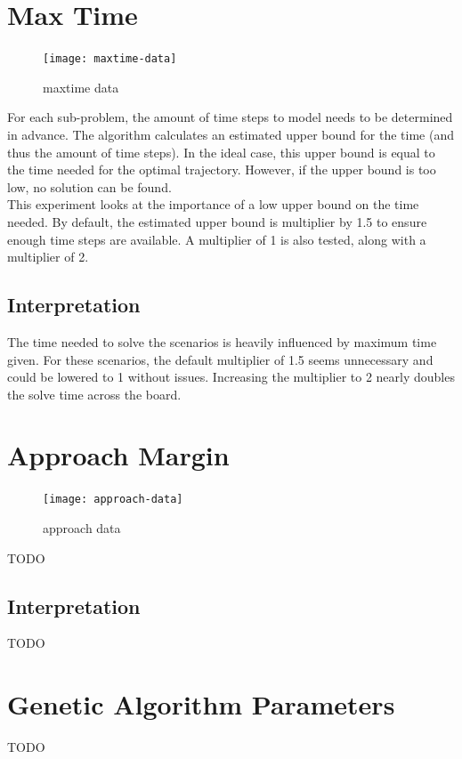 \clearpage
\section{Max Time}
\label{subsec:maxtime}
\begin{figure}[]
	\centering
	\texttt{[image: maxtime-data]}
	\caption{maxtime data}
	\label{fig:maxtime-data}
\end{figure}
For each sub-problem, the amount of time steps to model needs to be determined in advance. The algorithm calculates an estimated upper bound for the time (and thus the amount of time steps). In the ideal case, this upper bound is equal to the time needed for the optimal trajectory. However, if the upper bound is too low, no solution can be found.\\
This experiment looks at the importance of a low upper bound on the time needed. By default, the estimated upper bound is multiplier by 1.5 to ensure enough time steps are available. A multiplier of 1 is also tested, along with a multiplier of 2. 

\subsection{Interpretation}
The time needed to solve the scenarios is heavily influenced by maximum time given. For these scenarios, the default multiplier of 1.5 seems unnecessary and could be lowered to 1 without issues. Increasing the multiplier to 2 nearly doubles the solve time across the board.


\clearpage
\section{Approach Margin}
\label{subsec:approach-margin}
\begin{figure}[]
	\centering
	\texttt{[image: approach-data]}
	\caption{approach data}
	\label{fig:approach-data}
\end{figure}
TODO

\subsection{Interpretation}
TODO

\clearpage
\section{Genetic Algorithm Parameters}
\label{subsec:ga-params}
TODO



